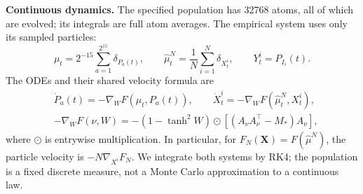 \noindent\textbf{Continuous dynamics.}
The specified population has 32768 atoms, all of which are evolved; its
integrals are full atom averages. The empirical system uses only its sampled
particles:
\[
 \mu_t=2^{-15}\sum_{a=1}^{2^{15}}\delta_{P_a(t)},\qquad
 \widehat\mu_t^N=\frac1N\sum_{i=1}^N\delta_{X_t^i},\qquad
 Y_t^i=P_{I_i}(t).
\]
The ODEs and their shared velocity formula are
\begin{equation}
\begin{aligned}
 &\dot P_a(t)=-\nabla_WF(\mu_t,P_a(t)),\qquad
 \dot X_t^i=-\nabla_WF(\widehat\mu_t^N,X_t^i),\\
 &-\nabla_WF(\nu,W)=-(1-\tanh^2W)\odot
             [(A_\nu A_\nu^\top-M_*)A_\nu],
\end{aligned}
\label{eq:numerical-flow}
\end{equation}
where \(\odot\) is entrywise multiplication. In particular, for
\(F_N(\mathbf X)=F(\widehat\mu^N)\), the particle velocity is
\(-N\nabla_{X^i}F_N\). We integrate both systems by RK4; the population is
a fixed discrete measure, not a Monte Carlo approximation to a continuous law.

